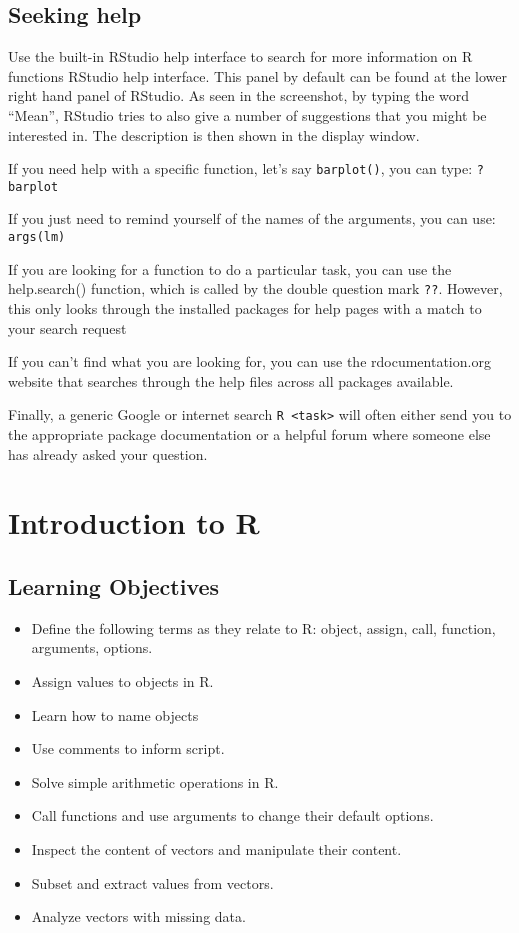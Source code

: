 \documentclass[]{book}
\providecommand{\tightlist}{%
  \setlength{\itemsep}{0pt}\setlength{\parskip}{0pt}}
\begin{document}
\hypertarget{seeking-help}{%
\section{Seeking help}\label{seeking-help}}

Use the built-in RStudio help interface to search for more information on R functions
RStudio help interface. This panel by default can be found at the lower right hand panel of RStudio. As seen in the screenshot, by typing the word ``Mean'', RStudio tries to also give a number of suggestions that you might be interested in. The description is then shown in the display window.

If you need help with a specific function, let's say \texttt{barplot()}, you can type: \texttt{?barplot}

If you just need to remind yourself of the names of the arguments, you can use:
\texttt{args(lm)}

If you are looking for a function to do a particular task, you can use the help.search() function, which is called by the double question mark \texttt{??}. However, this only looks through the installed packages for help pages with a match to your search request

If you can't find what you are looking for, you can use the rdocumentation.org website that searches through the help files across all packages available.

Finally, a generic Google or internet search \texttt{R\ \textless{}task\textgreater{}} will often either send you to the appropriate package documentation or a helpful forum where someone else has already asked your question.

\hypertarget{introduction-to-r}{%
\chapter{Introduction to R}\label{introduction-to-r}}

\hypertarget{learning-objectives}{%
\section{Learning Objectives}\label{learning-objectives}}

\begin{itemize}
\tightlist
\item
  Define the following terms as they relate to R: object, assign, call, function, arguments, options.
\item
  Assign values to objects in R.
\item
  Learn how to name objects
\item
  Use comments to inform script.
\item
  Solve simple arithmetic operations in R.
\item
  Call functions and use arguments to change their default options.
\item
  Inspect the content of vectors and manipulate their content.
\item
  Subset and extract values from vectors.
\item
  Analyze vectors with missing data.
\end{itemize}
\end{document}
